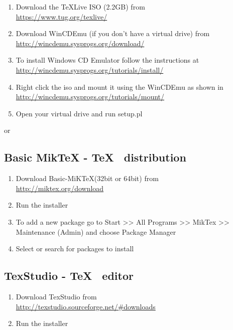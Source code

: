 \begin{enumerate}
\item	Download the TeXLive ISO (2.2GB) from\\
\href{https://www.tug.org/texlive/}{https://www.tug.org/texlive/}
\item	Download WinCDEmu (if you don't have a virtual drive) from \\
\href{http://wincdemu.sysprogs.org/download/}
{http://wincdemu.sysprogs.org/download/}
\item	To install Windows CD Emulator follow the instructions at\\
\href{http://wincdemu.sysprogs.org/tutorials/install/}
{http://wincdemu.sysprogs.org/tutorials/install/}
\item	Right click the iso and mount it using the WinCDEmu as shown in \\
\href{http://wincdemu.sysprogs.org/tutorials/mount/}{
http://wincdemu.sysprogs.org/tutorials/mount/}
\item	Open your virtual drive and run setup.pl
\end{enumerate}

or

\subsection*{Basic MikTeX - \TeX~ distribution}
\begin{enumerate}
\item	Download Basic-MiK\TeX (32bit or 64bit) from\\
\href{http://miktex.org/download}{http://miktex.org/download}
\item	Run the installer 
\item	To add a new package go to Start >> All Programs >> MikTex >> Maintenance (Admin) and choose Package Manager
\item	Select or search for packages to install
\end{enumerate}

\subsection*{TexStudio - \TeX~ editor}
\begin{enumerate}
\item	Download TexStudio from\\
\href{http://texstudio.sourceforge.net/\#downloads}
{http://texstudio.sourceforge.net/\#downloads} 
\item	Run the installer
\end{enumerate}

